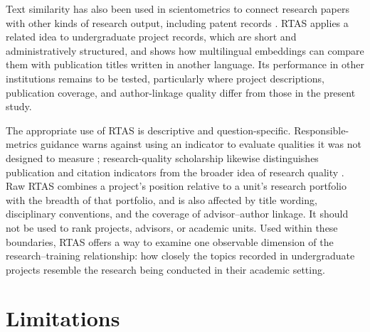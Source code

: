 \documentclass[pdflatex,sn-apa]{sn-jnl}
\begin{document}
Text similarity has also been used in scientometrics to connect research papers with other kinds of research output, including patent records \citep{motohashi2024measuring}. RTAS applies a related idea to undergraduate project records, which are short and administratively structured, and shows how multilingual embeddings can compare them with publication titles written in another language. Its performance in other institutions remains to be tested, particularly where project descriptions, publication coverage, and author-linkage quality differ from those in the present study.

The appropriate use of RTAS is descriptive and question-specific. Responsible-metrics guidance warns against using an indicator to evaluate qualities it was not designed to measure \citep{hicks2015leiden,wilsdon2015metrictide}; research-quality scholarship likewise distinguishes publication and citation indicators from the broader idea of research quality \citep{aksnes2019citations}. Raw RTAS combines a project's position relative to a unit's research portfolio with the breadth of that portfolio, and is also affected by title wording, disciplinary conventions, and the coverage of advisor--author linkage. It should not be used to rank projects, advisors, or academic units. Used within these boundaries, RTAS offers a way to examine one observable dimension of the research--training relationship: how closely the topics recorded in undergraduate projects resemble the research being conducted in their academic setting.

\section{Limitations}
\label{sec:limitations}
\end{document}
